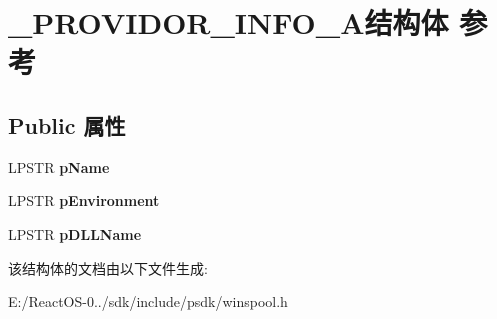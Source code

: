 \hypertarget{struct___p_r_o_v_i_d_o_r___i_n_f_o__1_a}{}\section{\+\_\+\+P\+R\+O\+V\+I\+D\+O\+R\+\_\+\+I\+N\+F\+O\+\_\+A结构体 参考}
\label{struct___p_r_o_v_i_d_o_r___i_n_f_o__1_a}
\subsection*{Public 属性}
\begin{DoxyCompactItemize}
\item 
\mbox{\label{struct___p_r_o_v_i_d_o_r___i_n_f_o__1_a_a09147fe2d0559da5876178ffd6621201}} 
L\+P\+S\+TR {\bfseries p\+Name}
\item 
\mbox{\label{struct___p_r_o_v_i_d_o_r___i_n_f_o__1_a_a3597e6de4cd410d27782acb43eed61f2}} 
L\+P\+S\+TR {\bfseries p\+Environment}
\item 
\mbox{\label{struct___p_r_o_v_i_d_o_r___i_n_f_o__1_a_a2c3429fa6e77d7a1dca3e0be888e887c}} 
L\+P\+S\+TR {\bfseries p\+D\+L\+L\+Name}
\end{DoxyCompactItemize}


该结构体的文档由以下文件生成\+:\begin{DoxyCompactItemize}
\item 
E\+:/\+React\+O\+S-\/0../sdk/include/psdk/winspool.\+h\end{DoxyCompactItemize}
